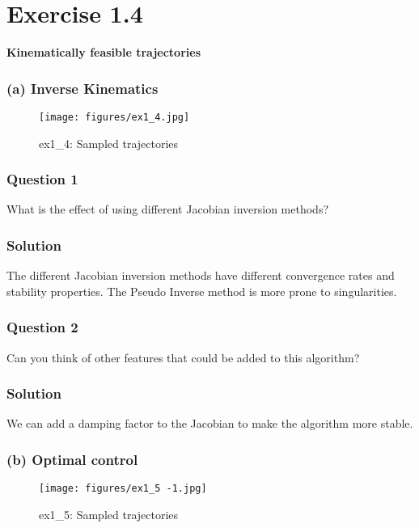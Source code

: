 \section*{Exercise 1.4}

\textbf{Kinematically feasible trajectories}

\subsubsection*{(a) Inverse Kinematics}

\begin{figure*}[htbp]
    \centering
    \texttt{[image: figures/ex1\_4.jpg]}
    \caption{ex1\_4: Sampled trajectories}
\end{figure*}

\subsubsection*{Question 1}

What is the effect of using different Jacobian inversion methods?

\subsubsection*{Solution}

The different Jacobian inversion methods have different convergence rates and stability properties.
The Pseudo Inverse method is more prone to singularities.

\subsubsection*{Question 2}

Can you think of other features that could be added to this algorithm?

\subsubsection*{Solution}

We can add a damping factor to the Jacobian to make the algorithm more stable.


\subsubsection*{(b) Optimal control}

\begin{figure*}[htbp]
    \centering
    \texttt{[image: figures/ex1\_5 -1.jpg]}
    \caption{ex1\_5: Sampled trajectories}
\end{figure*}
